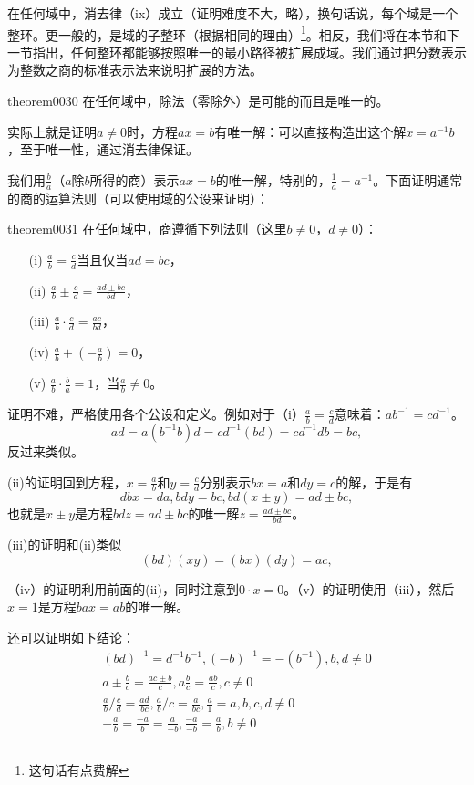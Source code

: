 在任何域中，消去律（ix）成立（证明难度不大，略），换句话说，每个域是一个整环。更一般的，是域的子整环（根据相同的理由）\footnote{这句话有点费解}。相反，我们将在本节和下一节指出，任何整环都能够按照唯一的最小路径被扩展成域。我们通过把分数表示为整数之商的标准表示法来说明扩展的方法。
\begin{theorem}{}{theorem0030}
在任何域中，除法（零除外）是可能的而且是唯一的。
\end{theorem}
实际上就是证明$a \neq 0$时，方程$ax=b$有唯一解：可以直接构造出这个解$x=a^{-1}b$，至于唯一性，通过消去律保证。

我们用$\frac{b}{a}$（$a$除$b$所得的商）表示$ax=b$的唯一解，特别的，$\frac{1}{a}=a^{-1}$。下面证明通常的商的运算法则（可以使用域的公设来证明）：
\begin{theorem}{}{theorem0031}
在任何域中，商遵循下列法则（这里$b \neq 0$，$d \neq 0$）：
\begin{enumerate}
\item[(i)] $\frac{a}{b}=\frac{c}{d}$当且仅当$ad=bc$，
\item[(ii)] $\frac{a}{b} \pm \frac{c}{d} = \frac{ad \pm bc}{bd}$，
\item[(iii)] $\frac{a}{b} \cdot \frac{c}{d} = \frac{ac}{bd}$，
\item[(iv)] $\frac{a}{b} + (-\frac{a}{b}) = 0$，
\item[(v)] $\frac{a}{b} \cdot \frac{b}{a} = 1$，当$\frac{a}{b}\neq 0$。
\end{enumerate}
\end{theorem}

证明不难，严格使用各个公设和定义。例如对于（i）$\frac{a}{b} = \frac{c}{d}$意味着：$ab^{-1}=cd^{-1}$。
\[
ad = a(b^{-1}b)d = cd^{-1}(bd) = cd^{-1}db=bc,
\]
反过来类似。

(ii)的证明回到方程，$x=\frac{a}{b}$和$y=\frac{c}{d}$分别表示$bx=a$和$dy=c$的解，于是有
\[
dbx=da, bdy=bc, bd(x \pm y) = ad \pm bc,
\]
也就是$x \pm y$是方程$bdz = ad \pm bc$的唯一解$z = \frac{ad \pm bc}{bd}$。

(iii)的证明和(ii)类似
\[
(bd)(xy) = (bx)(dy)=ac,
\]

（iv）的证明利用前面的(ii)，同时注意到$0 \cdot x = 0$。（v）的证明使用（iii），然后$x=1$是方程$bax = ab$的唯一解。

还可以证明如下结论：
\begin{gather}
(bd)^{-1} = d^{-1}b^{-1},(-b)^{-1} = -(b^{-1}), b,d \neq 0\\
a \pm\frac{b}{c} = \frac{ac \pm b}{c}, a\frac{b}{c} = \frac{ab}{c}, c \neq 0\\
\frac{a}{b}/\frac{c}{d} = \frac{ad}{bc}, \frac{a}{b}/c = \frac{a}{bc}, \frac{a}{1}=a, b,c,d\neq 0\\
-\frac{a}{b} = \frac{-a}{b} = \frac{a}{-b}, \frac{-a}{-b} = \frac{a}{b}, b \neq 0
\end{gather}

